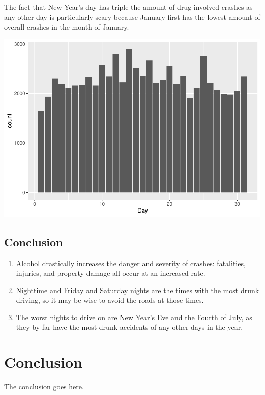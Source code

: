 \documentclass[conference,final,]{IEEEtran}
\begin{document}
The fact that New Year's day has triple the amount of drug-involved crashes as any other day is particularly scary because January first has the lowest amount of overall crashes in the month of January.

\begin{center}\includegraphics[width=0.9\columnwidth]{CAUSE_files/figure-latex/unnamed-chunk-16-1} \end{center}

\hypertarget{conclusion-1}{%
\subsection{Conclusion}\label{conclusion-1}}

\begin{enumerate}
\def\labelenumi{\arabic{enumi}.}
\item
  Alcohol drastically increases the danger and severity of crashes: fatalities, injuries, and property damage all occur at an increased rate.
\item
  Nighttime and Friday and Saturday nights are the times with the most drunk driving, so it may be wise to avoid the roads at those times.
\item
  The worst nights to drive on are New Year's Eve and the Fourth of July, as they by far have the most drunk accidents of any other days in the year.
\end{enumerate}

\hypertarget{conclusion-2}{%
\section{Conclusion}\label{conclusion-2}}

The conclusion goes here.
\end{document}
